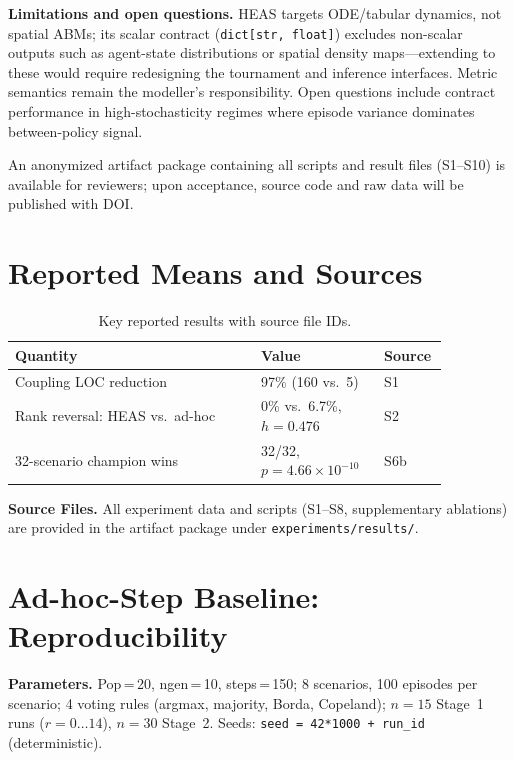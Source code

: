 \documentclass{wscpaperproc}
\begin{document}
\textbf{Limitations and open questions.} HEAS targets ODE/tabular dynamics, not
spatial ABMs; its scalar contract (\texttt{dict[str, float]}) excludes
non-scalar outputs such as agent-state distributions or spatial density
maps---extending to these would require redesigning the tournament and inference
interfaces. Metric semantics remain the modeller's responsibility. Open
questions include contract performance in high-stochasticity regimes where
episode variance dominates between-policy signal.

An anonymized artifact package containing all scripts and result files (S1--S10)
is available for reviewers; upon acceptance, source code and raw data will be
published with DOI.

\appendix
\section{Reported Means and Sources}

\begin{table}[ht]
\caption{Key reported results with source file IDs.}
\label{tab:appendix-results}
\centering\small
\begin{tabular}{p{0.52\linewidth}p{0.26\linewidth}p{0.08\linewidth}}
\toprule
Quantity & Value & Source \\
\midrule
Coupling LOC reduction & 97\% (160 vs.\ 5) & S1 \\
Rank reversal: HEAS vs.\ ad-hoc & 0\% vs.\ 6.7\%, $h\!=\!0.476$ & S2 \\
32-scenario champion wins & 32/32, $p\!=\!4.66\!\times\!10^{-10}$ & S6b \\
\bottomrule
\end{tabular}
\end{table}

\noindent\textbf{Source Files.} All experiment data and scripts (S1--S8, supplementary ablations)
are provided in the artifact package under \texttt{experiments/results/}.

\section{Ad-hoc-Step Baseline: Reproducibility}
\label{app:adhoc}

\textbf{Parameters.} Pop\,=\,20, ngen\,=\,10, steps\,=\,150; 8 scenarios,
100 episodes per scenario; 4 voting rules (argmax, majority, Borda, Copeland);
$n\!=\!15$ Stage~1 runs ($r\!=\!0\ldots14$), $n\!=\!30$ Stage~2. Seeds:
\texttt{seed = 42*1000 + run\_id} (deterministic).
\end{document}

